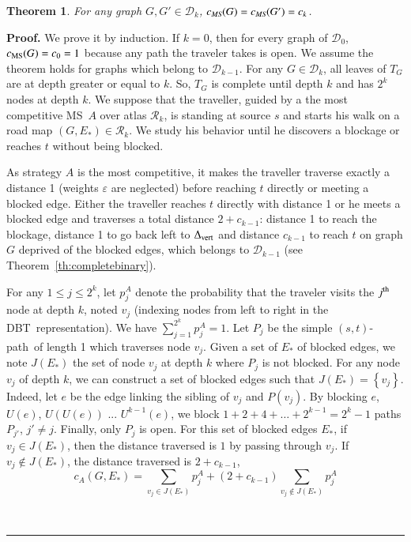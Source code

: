 \documentclass[preprint]{elsarticle}
\newtheorem{theorem}{Theorem}
\newenvironment{proof}[1][Proof]{\textbf{#1.} }{\ \rule{0.5em}{0.5em}}
\newcommand{\set}[1]{\left\{ #1 \right\}}
\newcommand{\ith}[1]{#1^{\mbox{\scriptsize{th}}}}
\newcommand{\stpath}{$(s,t)$-path}
\newcommand{\mcalr}{\mathcal{R}}
\newcommand{\mcald}{\mathcal{D}}
\newcommand{\mts}{MS}
\newcommand{\deltavert}{\Delta_{\mbox{\scriptsize{vert}}}}
\newcommand{\cms}{c_{\mbox{\scriptsize{MS}}}}
\newcommand{\ebt}{DBT}
\begin{document}
\begin{theorem}
For any graph $G, G' \in \mcald_k$, $c_{\emph{\scriptsize{MS}}}(G) = c_{\emph{\scriptsize{MS}}}(G') = c_k$.
\label{th:equalcompetitive}
\end{theorem}
\begin{proof}
We prove it by induction. If $k = 0$, then for every graph of $\mcald_0$, $\cms(G) = c_0 = 1$ because any path the traveler takes is open.
We assume the theorem holds for graphs which belong to $\mcald_{k-1}$. For any $G \in \mcald_k$, all leaves of $T_G$ are at depth greater or equal to $k$. So, $T_G$ is complete until depth $k$ and has $2^k$ nodes at depth $k$. We suppose that the traveller, guided by a the most competitive \mts ~$A$ over atlas $\mcalr_k$, is standing at source $s$ and starts his walk on a road map $\left(G,E_*\right) \in \mcalr_k$. We study his behavior until he discovers a blockage or reaches $t$ without being blocked.

As strategy $A$ is the most competitive, it makes the traveller traverse exactly a distance 1 (weights $\varepsilon$ are neglected) before reaching $t$ directly or meeting a blocked edge.
Either the traveller reaches $t$ directly with distance 1 or he meets a blocked edge and traverses a total distance $2 + c_{k-1}$: distance 1 to reach the blockage, distance 1 to go back left to $\deltavert$ and distance $c_{k-1}$ to reach $t$ on graph $G$ deprived of the blocked edges, which belongs to $\mcald_{k-1}$ (see Theorem~\ref{th:completebinary}).

For any $1 \le j \le 2^k$, let $p_j^A$ denote the probability that the traveler visits the $\ith{j}$ node at depth $k$, noted $v_j$ (indexing nodes from left to right in the \ebt ~representation). We have $\sum_{j=1}^{2^k} p_j^A = 1$. Let $P_j$ be the simple \stpath ~of length 1 which traverses node $v_j$.
Given a set of $E_*$ of blocked edges, we note $J(E_*)$ the set of node $v_j$ at depth $k$ where $P_j$ is not blocked. For any node $v_j$ of depth $k$, we can construct a set of blocked edges such that $J(E_*) = \set{v_j}$. Indeed, let $e$ be the edge linking the sibling of $v_j$ and $P\left(v_j\right)$. By blocking $e$,  $U(e)$, $U(U(e))$ ... $U^{k-1}(e)$, we block $1+2+4+\ldots+2^{k-1} = 2^k - 1$ paths $P_{j'}$, $j' \neq j$. Finally, only $P_j$ is open.
For this set of blocked edges $E_*$, if $v_j \in J(E_*)$, then the distance traversed is $1$ by passing through $v_j$. If $v_j \notin J(E_*)$, the distance traversed is $2 + c_{k-1}$,
\[
c_A(G, E_*) = \sum_{v_j\in J(E_*)} p_j^A+  (2+c_{k-1})\sum_{v_j\notin J(E_*)}p_j^A
\]


\end{proof}
\end{document}
